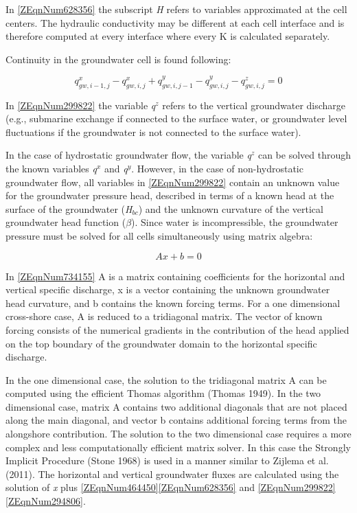 \documentclass{article}
\begin{document}
\noindent In \eqref{ZEqnNum628356} the subscript \textit{H} refers to variables approximated at the cell centers. The hydraulic conductivity may be different at each cell interface and is therefore computed at every interface where every K is calculated separately.

\noindent 

\noindent Continuity in the groundwater cell is found following:

\noindent 
\begin{equation} \label{ZEqnNum299822} 
q_{gw,i-1,j}^{x} -q_{gw,i,j}^{x} +q_{gw,i,j-1}^{y} -q_{gw,i,j}^{y} -q_{gw,i,j}^{z} =0 
\end{equation} 


\noindent In \eqref{ZEqnNum299822} the variable \textit{q${}^{z}$} refers to the vertical groundwater discharge (e.g., submarine exchange if connected to the surface water, or groundwater level fluctuations if the groundwater is not connected to the surface water).

\noindent 

\noindent In the case of hydrostatic groundwater flow, the variable \textit{q${}^{z}$} can be solved through the known variables \textit{q${}^{x}$} and \textit{q${}^{y}$}. However, in the case of non-hydrostatic groundwater flow, all variables in \eqref{ZEqnNum299822} contain an unknown value for the groundwater pressure head, described in terms of a known head at the surface of the groundwater (\textit{H${}_{bc}$}) and the unknown curvature of the vertical groundwater head function (\textit{$\beta $}). Since water is incompressible, the groundwater pressure must be solved for all cells simultaneously using matrix algebra:

\noindent 
\begin{equation} \label{ZEqnNum734155} 
Ax+b=0 
\end{equation} 


\noindent In \eqref{ZEqnNum734155} A is a matrix containing coefficients for the horizontal and vertical specific discharge, x is a vector containing the unknown groundwater head curvature, and b contains the known forcing terms. For a one dimensional cross-shore case, A is reduced to a tridiagonal matrix. The vector of known forcing consists of the numerical gradients in the contribution of the head applied on the top boundary of the groundwater domain to the horizontal specific discharge.

\noindent 

\noindent In the one dimensional case, the solution to the tridiagonal matrix A can be computed using the efficient Thomas algorithm (Thomas 1949). In the two dimensional case, matrix A contains two additional diagonals that are not placed along the main diagonal, and vector b contains additional forcing terms from the alongshore contribution. The solution to the two dimensional case requires a more complex and less computationally efficient matrix solver. In this case the Strongly Implicit Procedure (Stone 1968) is used in a manner similar to Zijlema et al. (2011). The horizontal and vertical groundwater fluxes are calculated using the solution of\textit{ x} plus \eqref{ZEqnNum464450}\eqref{ZEqnNum628356} and \eqref{ZEqnNum299822}\eqref{ZEqnNum294806}. 
\end{document}
